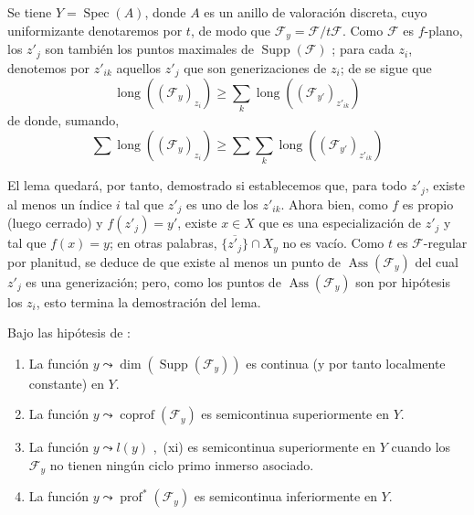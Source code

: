 \begin{env}[12.2.1.3]
Se tiene $Y=\operatorname{Spec}(A)$, donde $A$ es un anillo de valoración discreta, cuyo uniformizante denotaremos por $t$, de modo que $\mathcal F_y=\mathcal F/t\mathcal F$.
Como $\mathcal F$ es $f$-plano, los $z'_j$ son también los puntos maximales de $\operatorname{Supp}(\mathcal F)$ ; para cada $z_i$, denotemos por $z'_{ik}$ aquellos $z'_j$ que son generizaciones de $z_i$; de  se sigue que
\[
  \operatorname{long}((\mathcal F_y)_{z_i})
  \geq\sum_k\operatorname{long}((\mathcal F_{y'})_{z'_{ik}})
\]
de donde, sumando,
\[
  \sum\operatorname{long}((\mathcal F_y)_{z_i})
  \geq\sum\sum_k\operatorname{long}((\mathcal F_{y'})_{z'_{ik}})
\]

El lema quedará, por tanto, demostrado si establecemos que, para todo $z'_j$, existe al menos un índice $i$ tal que $z'_j$ es uno de los $z'_{ik}$.
Ahora bien, como $f$ es propio (luego cerrado) y $f(z'_j)=y'$, existe $x\in X$ que es una especialización de $z'_j$ y tal que $f(x)=y$; en otras palabras, $\overline{\{z'_j\}}\cap X_y$ no es vacío.
Como $t$ es $\mathcal F$-regular por planitud, se deduce de  que existe al menos un punto de $\operatorname{Ass}(\mathcal F_y)$ del cual $z'_j$ es una generización; pero, como los puntos de $\operatorname{Ass}(\mathcal F_y)$ son por hipótesis los $z_i$, esto termina la demostración del lema.
\end{env}

\begin{corollary}[12.2.2]
\label{IV.12.2.2}
Bajo las hipótesis de :
\begin{enumerate}[label=\textup{(\roman*)}]
  \item La función $y\leadsto\dim(\operatorname{Supp}(\mathcal F_y))$ es continua (y por tanto localmente constante) en $Y$.
  \item La función $y\leadsto\operatorname{coprof}(\mathcal F_y)$  es semicontinua superiormente en $Y$.
  \item La función $y\leadsto l(y)$ ,~\textup{(xi)} es semicontinua superiormente en $Y$ cuando los $\mathcal F_y$ no tienen ningún ciclo primo inmerso asociado.

  \item La función $y\leadsto\operatorname{prof}^{*}(\mathcal F_y)$  es semicontinua inferiormente en $Y$.
\end{enumerate}
\end{corollary}




